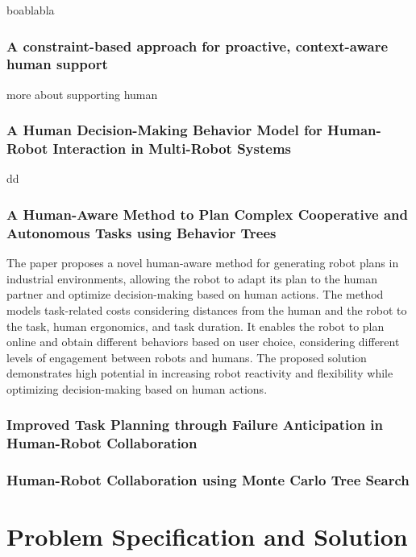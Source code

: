 boablabla

\subsubsection{A constraint-based approach for proactive, context-aware human support}

more about supporting human

\subsubsection{A Human Decision-Making Behavior Model for Human-Robot Interaction in Multi-Robot Systems}

dd

\subsubsection{A Human-Aware Method to Plan Complex Cooperative and Autonomous Tasks using Behavior Trees}

The paper proposes a novel human-aware method for generating robot plans in industrial environments, allowing the robot to adapt its plan to the human partner and optimize decision-making based on human actions. The method models task-related costs considering distances from the human and the robot to the task, human ergonomics, and task duration. It enables the robot to plan online and obtain different behaviors based on user choice, considering different levels of engagement between robots and humans. The proposed solution demonstrates high potential in increasing robot reactivity and flexibility while optimizing decision-making based on human actions.

\subsubsection{Improved Task Planning through Failure Anticipation in Human-Robot Collaboration}

\subsubsection{Human-Robot Collaboration using Monte Carlo Tree Search}



\section{Problem Specification and Solution}

